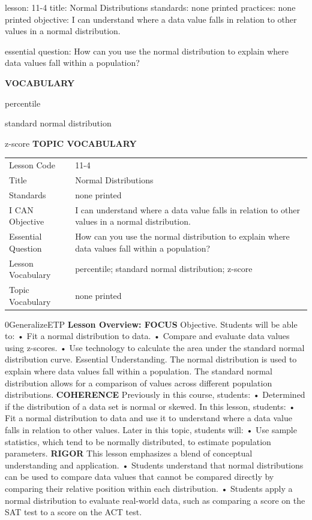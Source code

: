 \documentclass{article}
\newenvironment{lesson-meta}{}{}        %
\newenvironment{te-addendum}[2]{}{}     %
\newcommand{\te}[1]{}                   %
\begin{document}
\begin{lesson-meta}
lesson: 11-4
title: Normal Distributions
standards: none printed
practices: none printed
objective: I can understand where a data value falls in relation to other values in a normal distribution.

essential question: How can you use the normal distribution to explain where data values fall within a population?

\textbf{VOCABULARY}
\item percentile
\item standard normal distribution
\item z-score
\textbf{TOPIC VOCABULARY}
\te{No topic vocabulary list is printed on these lesson pages.}
\begin{tabular}{ll}
Lesson Code & 11-4 \\
Title & Normal Distributions \\
Standards & none printed \\
I CAN Objective & I can understand where a data value falls in relation to other values in a normal distribution. \\
Essential Question & How can you use the normal distribution to explain where data values fall within a population? \\
Lesson Vocabulary & percentile; standard normal distribution; z-score \\
Topic Vocabulary & none printed \\
\end{tabular}
\end{lesson-meta}
\begin{te-addendum}{0}{GeneralizeETP}
\textbf{Lesson Overview: FOCUS}
Objective. Students will be able to:
• Fit a normal distribution to data.
• Compare and evaluate data values using z-scores.
• Use technology to calculate the area under the standard normal distribution curve.
Essential Understanding. The normal distribution is used to explain where data values fall within a population. The standard normal distribution allows for a comparison of values across different population distributions.
\textbf{COHERENCE}
Previously in this course, students:
• Determined if the distribution of a data set is normal or skewed.
In this lesson, students:
• Fit a normal distribution to data and use it to understand where a data value falls in relation to other values.
Later in this topic, students will:
• Use sample statistics, which tend to be normally distributed, to estimate population parameters.
\textbf{RIGOR}
This lesson emphasizes a blend of conceptual understanding and application.
• Students understand that normal distributions can be used to compare data values that cannot be compared directly by comparing their relative position within each distribution.
• Students apply a normal distribution to evaluate real-world data, such as comparing a score on the SAT test to a score on the ACT test.
\end{te-addendum}
\end{document}
